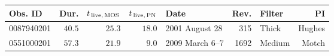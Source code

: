 \begin{tabular}{@{}lrrrlrlr@{}}
    \toprule
    Obs. ID & Dur. & $t_{\mathrm{\,live},\,\mathrm{MOS}}$ & $t_{\mathrm{\,live},\,\mathrm{PN}}$
        & Date & Rev. & Filter & PI \\
    \midrule
    0087940201 & $40.5$ & $25.3$ & $18.0$ & 2001 August 28 & 315 & Thick & Hughes \\
    0551000201 & $57.3$ & $21.9$ &  $9.0$ & 2009 March 6--7 & 1692 & Medium & Motch \\
    \bottomrule
\end{tabular}
